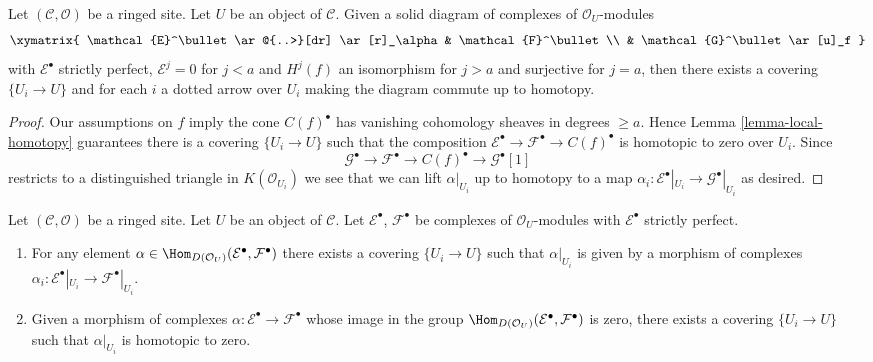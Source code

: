 \begin{lemma}
\label{lemma-lift-through-quasi-isomorphism}
Let $(\mathcal{C}, \mathcal{O})$ be a ringed site. Let $U$ be an object of
$\mathcal{C}$. Given a solid diagram of complexes of $\mathcal{O}_U$-modules
$$
\xymatrix{
\mathcal{E}^\bullet \ar@{..>}[dr] \ar[r]_\alpha & \mathcal{F}^\bullet \\
& \mathcal{G}^\bullet \ar[u]_f
}
$$
with $\mathcal{E}^\bullet$ strictly perfect, $\mathcal{E}^j = 0$ for
$j < a$ and $H^j(f)$ an isomorphism for $j > a$ and surjective for
$j = a$, then there exists a covering $\{U_i \to U\}$ and for each $i$
a dotted arrow over $U_i$ making the diagram commute up to homotopy.
\end{lemma}

\begin{proof}
Our assumptions on $f$ imply the cone $C(f)^\bullet$ has vanishing
cohomology sheaves in degrees $\geq a$.
Hence Lemma \ref{lemma-local-homotopy} guarantees there is a
covering $\{U_i \to U\}$ such that the composition
$\mathcal{E}^\bullet \to \mathcal{F}^\bullet \to C(f)^\bullet$
is homotopic to zero over $U_i$. Since
$$
\mathcal{G}^\bullet \to \mathcal{F}^\bullet \to C(f)^\bullet \to
\mathcal{G}^\bullet[1]
$$
restricts to a distinguished triangle in $K(\mathcal{O}_{U_i})$
we see that we can lift $\alpha|_{U_i}$ up to homotopy to a map
$\alpha_i : \mathcal{E}^\bullet|_{U_i} \to \mathcal{G}^\bullet|_{U_i}$
as desired.
\end{proof}

\begin{lemma}
\label{lemma-local-actual}
Let $(\mathcal{C}, \mathcal{O})$ be a ringed site. Let $U$ be an object
of $\mathcal{C}$. Let $\mathcal{E}^\bullet$, $\mathcal{F}^\bullet$ be
complexes of $\mathcal{O}_U$-modules with $\mathcal{E}^\bullet$ strictly
perfect.
\begin{enumerate}
\item For any element
$\alpha \in \Hom_{D(\mathcal{O}_U)}(\mathcal{E}^\bullet, \mathcal{F}^\bullet)$
there exists a covering $\{U_i \to U\}$ such that
$\alpha|_{U_i}$ is given by a morphism of complexes
$\alpha_i : \mathcal{E}^\bullet|_{U_i} \to \mathcal{F}^\bullet|_{U_i}$.
\item Given a morphism of complexes
$\alpha : \mathcal{E}^\bullet \to \mathcal{F}^\bullet$
whose image in the group
$\Hom_{D(\mathcal{O}_U)}(\mathcal{E}^\bullet, \mathcal{F}^\bullet)$
is zero, there exists a covering $\{U_i \to U\}$ such that
$\alpha|_{U_i}$ is homotopic to zero.
\end{enumerate}
\end{lemma}

